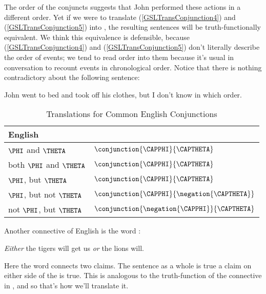 The order of the conjuncts suggests that John performed these actions in a different order.  Yet if we were to translate (\ref{GSLTransConjunction4}) and (\ref{GSLTransConjunction5}) into \GSL{}, the resulting sentences will be truth-functionally equivalent.  We think this equivalence is defensible, because (\ref{GSLTransConjunction4}) and (\ref{GSLTransConjunction5}) don't literally describe the order of events; we tend to read order into them because it's usual in conversation to recount events in chronological order.  Notice that there is nothing contradictory about the following sentence:

\begin{menumerate}
	\item John went to bed and took off his clothes, but I don't know in which order.
\end{menumerate}

\begin{table}
	\renewcommand{\arraystretch}{1.5}%
	\begin{center}
		\begin{tabular}{ l l } %
			\toprule
			\textbf{English} & \textbf{\GSL{}} \\ 
			\midrule
			$\PHI$ and $\THETA$ & $\conjunction{\CAPPHI}{\CAPTHETA}$ \\
			both $\PHI$ and $\THETA$ & $\conjunction{\CAPPHI}{\CAPTHETA}$ \\
			$\PHI$, but $\THETA$ & $\conjunction{\CAPPHI}{\CAPTHETA}$ \\
			$\PHI$, but not $\THETA$ & $\conjunction{\CAPPHI}{\negation{\CAPTHETA}}$ \\
			not $\PHI$, but $\THETA$ & $\conjunction{\negation{\CAPPHI}}{\CAPTHETA}$ \\
			\bottomrule
		\end{tabular} 
		\caption{Translations for Common English Conjunctions}
		\label{TransTableD} 
	\end{center}
\end{table}

Another connective of English is the word :

\begin{menumerate}
	\item \emph{Either} the tigers will get us \emph{or} the lions will.
\end{menumerate}

\noindent{}Here the word  connects two claims.  The sentence as a whole is true \Iff a claim on either side of the  is true.  This is analogous to the truth-function of the \mention{$\VEE$} connective in \GSL{}, and so that's how we'll translate it.

